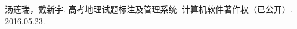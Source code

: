 \documentclass[master, winfont]{njuthesis}
\begin{document}
\backmatter
\begin{resume}
\begin{systems}
\item 汤莲瑞，戴新宇. 高考地理试题标注及管理系统. 计算机软件著作权（已公开）. 2016.05.23.
\end{systems}
\end{resume}

\makelicense

\end{document}
